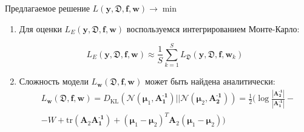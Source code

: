 \documentclass{beamer}
\newcommand{\DD}{{\mathfrak{D}}}
\newcommand{\bw}{{\textbf{w}}}
\newcommand{\II}{{\textbf{I}}}
\newcommand{\bbf}{{\textbf{f}}}
\newcommand{\by}{{\textbf{y}}}
\newcommand{\bm}{{\textbf{m}}}
\newcommand{\bAo}{\mathbf{A^\text{-1}_\text{1}}}
\newcommand{\bAt}{\mathbf{A^\text{-1}_\text{2}}}
\newcommand{\bmuo}{{\boldsymbol{\mu}_1}}
\newcommand{\bmut}{{\boldsymbol{\mu}_2}}
\newcommand{\DKL}{\mathit{D}_{\text{KL}}}
\begin{document}
\begin{frame}{Предлагаемое решение $L(\by,\DD,\bbf,\bw) \to \min$}

\begin{enumerate}
	\item 
Для оценки $L_E(\by,\DD,\bbf,\bw)$ воспользуемся интегрированием 
Монте-Карло:

$$L_E(\by,\DD,\bbf,\bw) \approx \frac1S\sum\limits_{k=1}^S L_\DD(\by,\DD, \bbf,\bw_k)$$

\item
Сложность модели $L_\bw(\DD,\bbf,\bw)$ может быть найдена аналитически:
\begin{align*}
&L_\bw(\DD,\bbf,\bw) = \DKL(\mathcal{N}(\bmuo,\bAo)||\mathcal{N}(\bmut,\bAt)) = \frac12 \big( \log \frac{|\bAt|}{|\bAo|}-\\
&-W+\text{tr}(\textbf{A}_2\bAo)+(\bmuo-\bmut)^T\textbf{A}_2(\bmuo-\bmut) \big) 
\end{align*}

\end{enumerate}

\end{frame}

%
%
%
%
%
%
%
\end{document}
